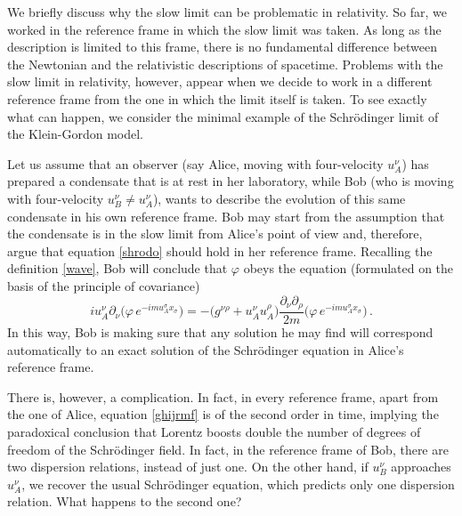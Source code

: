 \documentclass[a4paper, amsfonts, amssymb, amsmath, reprint, twocolumn, showkeys, nofootinbib]{revtex4-2}
\begin{document}
We briefly discuss why the slow limit can be problematic in relativity. 
So far, we worked in the reference frame in which the slow limit was taken. As long as the description is limited to this frame, there is no fundamental difference between the Newtonian and the relativistic descriptions of spacetime. 
Problems with the slow limit in relativity, however, appear when we decide to work in a different reference frame from the one in which the limit itself is taken. To see exactly what can happen, we consider the minimal example of the Schr\"{o}dinger limit of the Klein-Gordon model.

Let us assume that an observer (say Alice, moving with four-velocity $u_A^\nu$) has prepared a condensate that is at rest in her laboratory, while Bob (who is moving with four-velocity $u_B^\nu \neq u_A^\nu$), wants to describe the evolution of this same condensate in his own reference frame. 
Bob may start from the assumption that the condensate is in the slow limit from Alice's point of view and, therefore, argue that equation \eqref{shrodo} should hold in her reference frame. 
Recalling the definition \eqref{wave}, Bob will conclude that $\varphi$ obeys the  equation (formulated on the basis of the principle of covariance)
\begin{equation}\label{ghijrmf}
i u_A^\nu \partial_\nu \big( \varphi \, e^{-im u_A^\sigma x_\sigma} \big) 
= 
- \big( g^{\nu \rho} + u_A^\nu u_A^\rho \big) \dfrac{ \partial_\nu \partial_\rho}{2m}
\big( \varphi \, e^{-im u_A^\sigma x_\sigma} \big) \, .
\end{equation}
In this way, Bob is making sure that any solution he may find will correspond automatically to an exact solution of the  Schr\"{o}dinger equation in Alice's reference frame. 

There is, however, a complication. In fact, in every reference frame, apart from the one of Alice, equation \eqref{ghijrmf} is of the second order in time, implying the paradoxical conclusion that Lorentz boosts double the number of degrees of freedom of the Schr\"{o}dinger field. 
In fact, in the reference frame of Bob, there are two dispersion relations, instead of just one. On the other hand, if $u_B^\nu$ approaches $u_A^\nu$, we  recover the usual Schr\"{o}dinger equation, which predicts only one dispersion relation. What happens to the second one? 
\end{document}
